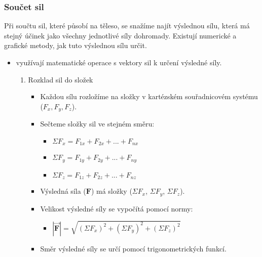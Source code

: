 \documentclass[letterpaper,10pt,english]{jupyterBook}
\begin{document}
\subsubsection{Součet sil}
\label{\detokenize{Prednasky/1_3_Dynamika_pohybu_v_1D:soucet-sil}}
\sphinxAtStartPar
Při součtu sil, které působí na těleso, se snažíme najít výslednou sílu, která má stejný účinek jako všechny jednotlivé síly dohromady. Existují numerické a grafické metody, jak tuto výslednou sílu určit.
\begin{itemize}
\item {} 
\sphinxAtStartPar
{} využívají matematické operace s vektory sil k určení výsledné síly.
\begin{enumerate}
%
\item {} 
\sphinxAtStartPar
Rozklad sil do složek
\begin{itemize}
\item {} 
\sphinxAtStartPar
Každou sílu rozložíme na složky v kartézském souřadnicovém systému (\(F_x, F_y, F_z\)).

\item {} 
\sphinxAtStartPar
Sečteme složky sil ve stejném směru:
\begin{itemize}
\item {} 
\sphinxAtStartPar
\(\Sigma F_x = F_{1x} + F_{2x} + ... + F_{nx}\)

\item {} 
\sphinxAtStartPar
\(\Sigma F_y = F_{1y} + F_{2y} + ... + F_{ny}\)

\item {} 
\sphinxAtStartPar
\(\Sigma F_z = F_{1z} + F_{2z} + ... + F_{nz}\)

\end{itemize}

\item {} 
\sphinxAtStartPar
Výsledná síla (\(\mathbf{F}\)) má složky (\(\Sigma F_x\), \(\Sigma F_y\), \(\Sigma F_z\)).

\item {} 
\sphinxAtStartPar
Velikost výsledné síly se vypočítá pomocí normy:
\begin{itemize}
\item {} 
\sphinxAtStartPar
\(|\vec{\mathbf{F}}| = \sqrt{(\Sigma F_x)^2 + (\Sigma F_y)^2 + (\Sigma F_z)^2}\)

\end{itemize}

\item {} 
\sphinxAtStartPar
Směr výsledné síly se určí pomocí trigonometrických funkcí.


\end{itemize}
\end{enumerate}
\end{itemize}
\end{document}
